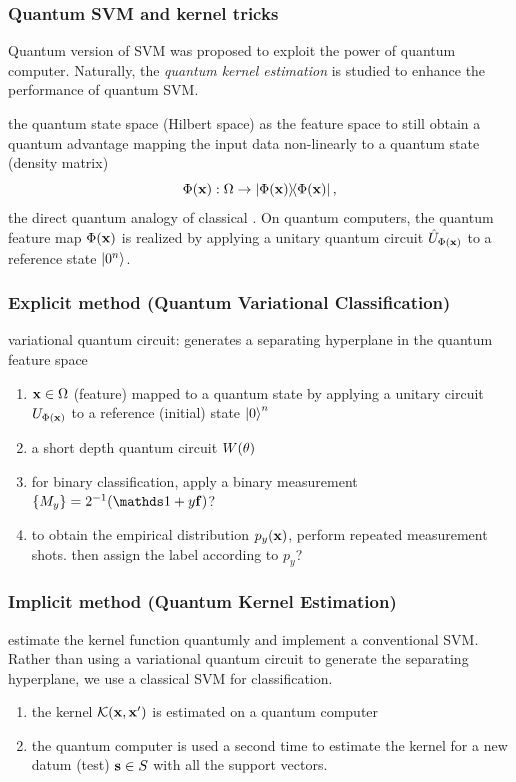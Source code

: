 \subsubsection{Quantum SVM and kernel tricks}
Quantum version of SVM was proposed \cite{rebentrostQuantumSupportVector2014} to exploit the power of quantum computer.
Naturally, the \emph{quantum kernel estimation}
\cite{schuldQuantumMachineLearning2019}
\cite{havlicekSupervisedLearningQuantum2019} 
is studied to enhance the performance of quantum SVM.
\begin{definition}\label{def:quantum_feature_map}
	the quantum state space (Hilbert space) as the feature space to still obtain a quantum advantage
	mapping the input data non-linearly to a quantum state (density matrix) 
	\begin{equation}
		\Phi(\vbx): \Omega \to \dyad{\Phi(\vbx)},
		\label{eq:quantum_feature_map}
	\end{equation}
	the direct quantum analogy of classical .
	On quantum computers, the quantum feature map $\Phi(\vb{x})$ is realized by applying a unitary quantum circuit $\hat{U}_{\Phi(\vb{x})}$ to a reference state $\ket{0^n}$.
\end{definition}

\subsubsection{Explicit method (Quantum Variational Classification)}
variational quantum circuit: generates a separating hyperplane in the quantum feature space
\begin{enumerate}
	\item $\vb{x}\in\Omega$ (feature) mapped to a quantum state by applying a unitary circuit $U_{\Phi(\vb{x})}$ to a reference (initial) state $\ket{0}^n$
	\item a short depth quantum circuit $W(\vb{\theta})$
	\item for binary classification, apply a binary measurement $\qty{M_y}=2^{-1}(\identity + y \vb{f})$?
	\item to obtain the empirical distribution $p_y(\vb{x})$, perform repeated measurement shots.
	then assign the label according to $p_y$?
\end{enumerate}

\subsubsection{Implicit method (Quantum Kernel Estimation)}
estimate the kernel function quantumly and implement a conventional SVM.
Rather than using a variational quantum circuit to generate the separating hyperplane, we use a classical SVM for classification.
\begin{enumerate}
	\item the kernel $\mathcal{K}(\vb{x},\vb{x}')$ is estimated on a quantum computer
	\item the quantum computer is used a second time to estimate the kernel for a new datum (test) $\vb{s}\in S$ with all the support vectors.
\end{enumerate}

